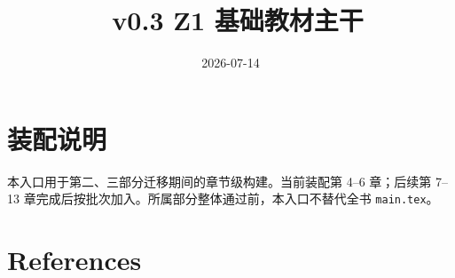 \documentclass[UTF8,a4paper,12pt,openany]{ctexbook}
\title{\ReportTitle\ v0.3 Z1 基础教材主干}
\author{\ReportAuthor}
\date{2026-07-14}
\begin{document}
\frontmatter
\maketitle
\chapter*{装配说明}
本入口用于第二、三部分迁移期间的章节级构建。当前装配第 4--6 章；后续第 7--13 章完成后按批次加入。所属部分整体通过前，本入口不替代全书 \texttt{main.tex}。
\tableofcontents

\mainmatter
\setcounter{chapter}{3}












\backmatter
\chapter{References}
\printbibliography[heading=none]
\end{document}
